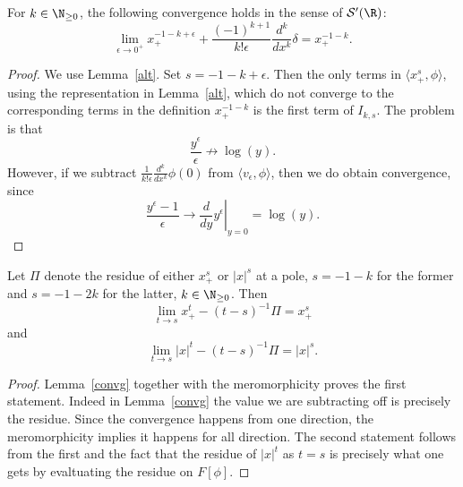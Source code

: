 \documentclass[12pt]{article}
\begin{document}
\begin{lem}\label{convg}For $k \in \N_{\geq 0}$, the following convergence holds in the sense of $\mathcal S'(\R)$:
\[\lim_{\epsilon \to 0^+} x_+^{-1-k+\epsilon} + \frac{(-1)^{k+1}}{k!\epsilon}\frac{d^k}{dx^k}\delta = x_+^{-1-k}.\]\end{lem}
\begin{proof}
We use Lemma~\ref{alt}. Set $s = -1-k+\epsilon$. Then the only terms in $\langle x_+^s,\phi\rangle$, using the representation in Lemma~\ref{alt}, which do not converge to the corresponding terms in the definition $x_+^{-1-k}$ is the first term of $I_{k,s}$. The problem is that
\[\frac{y^{\epsilon}}{\epsilon} \not \to \log(y).\] However, if we subtract $\frac{1}{k!\epsilon}\frac{d^k}{dx^{k}}\phi(0)$ from $\langle v_\epsilon,\phi\rangle$, then we do obtain convergence, since
\[\frac{y^\epsilon-1}{\epsilon} \to \left.\frac{d}{dy} y^{\epsilon}\right|_{y=0} = \log(y).\]
\end{proof}

\begin{cor}\label{regvalue}Let $\Pi$ denote the residue of either $x_+^s$ or $|x|^s$ at a pole, $s=-1-k$ for the former and $s=-1-2k$ for the latter, $k \in \N_{\geq 0}$. Then
\[\lim_{t \to s} x_+^t - (t-s)^{-1}\Pi = x_+^s\] and
\[\lim_{t \to s} |x|^t - (t-s)^{-1}\Pi = |x|^s.\]
\end{cor}
\begin{proof}Lemma~\ref{convg} together with the meromorphicity proves the first statement. Indeed in Lemma~\ref{convg} the value we are subtracting off is precisely the residue. Since the convergence happens from one direction, the meromorphicity implies it happens for all direction. The second statement follows from the first and the fact that the residue of $|x|^t$ as $t=s$ is precisely what one gets by evaltuating the residue on $F[\phi]$.\end{proof}
\end{document}
